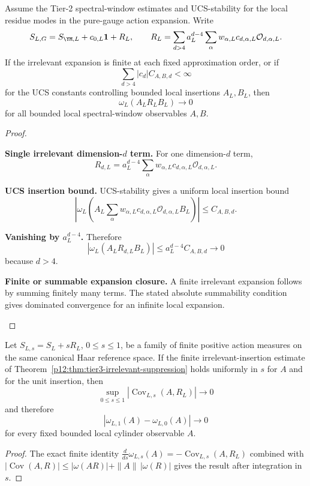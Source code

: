 \documentclass[12pt,a4paper]{article}
\begin{document}
\begin{theorem}
\label{p12:thm:tier3-irrelevant-suppression}
Assume the Tier-2 spectral-window estimates and UCS-stability for the local residue modes in the pure-gauge action expansion.  Write
\[
S_{L,G}=S_{\YM,L}+c_{0,L}\mathbf 1+R_L,
\qquad
R_L=\sum_{d>4}a_L^{d-4}\sum_{\alpha}w_{\alpha,L}c_{d,\alpha,L}\mathcal O_{d,\alpha,L}.
\]
If the irrelevant expansion is finite at each fixed approximation order, or if
\[
\sum_{d>4}|c_d|C_{A,B,d}<\infty
\]
for the UCS constants controlling bounded local insertions \(A_L,B_L\), then
\[
\omega_L(A_LR_LB_L)\longrightarrow 0
\]
for all bounded local spectral-window observables \(A,B\).
\end{theorem}
\begin{proof}
\begin{proofsteps}
\item \textbf{Single irrelevant dimension-\(d\) term.}
For one dimension-\(d\) term,
\[
R_{d,L}=a_L^{d-4}\sum_\alpha w_{\alpha,L}c_{d,\alpha,L}\mathcal O_{d,\alpha,L}.
\]

\item \textbf{UCS insertion bound.}
UCS-stability gives a uniform local insertion bound
\[
\left|\omega_L\!\left(A_L\sum_\alpha w_{\alpha,L}c_{d,\alpha,L}\mathcal O_{d,\alpha,L}B_L\right)\right|
\le C_{A,B,d}.
\]

\item \textbf{Vanishing by \(a_L^{d-4}\).}
Therefore
\[
|\omega_L(A_LR_{d,L}B_L)|\le a_L^{d-4}C_{A,B,d}\to0
\]
because \(d>4\).

\item \textbf{Finite or summable expansion closure.}
A finite irrelevant expansion follows by summing finitely many terms.  The stated absolute summability condition gives dominated convergence for an infinite local expansion.
\end{proofsteps}
\end{proof}

\begin{corollary}
\label{p12:cor:uniform-action-interpolation-universality}
Let $S_{L,s}=S_L+sR_L$, $0\le s\le1$, be a family of finite positive
action measures on the same canonical Haar reference space.  If the finite
irrelevant-insertion estimate of Theorem~\ref{p12:thm:tier3-irrelevant-suppression}
holds uniformly in $s$ for $A$ and for the unit insertion, then
\[
 \boxed{
 \sup_{0\le s\le1}|\operatorname{Cov}_{L,s}(A,R_L)|\longrightarrow0}
\]
and therefore
\[
 \boxed{|\omega_{L,1}(A)-\omega_{L,0}(A)|\longrightarrow0}
\]
for every fixed bounded local cylinder observable $A$.
\end{corollary}
\begin{proof}
The exact finite identity
$\frac d{ds}\omega_{L,s}(A)=-\operatorname{Cov}_{L,s}(A,R_L)$
combined with
$|\operatorname{Cov}(A,R)|\le|\omega(AR)|+\|A\|\,|\omega(R)|$
gives the result after integration in $s$.
\end{proof}
\end{document}
